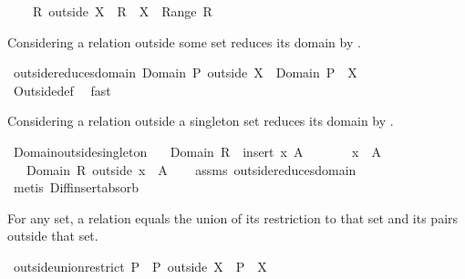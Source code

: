 \begin{isabellebody}
\ \ \ \ {\isachardoublequoteopen}R\ outside\ X\ {\isacharequal}\ R\ {\isacharminus}\ {\isacharparenleft}X\ {\isasymtimes}\ Range\ R{\isacharparenright}{\isachardoublequoteclose}%
\begin{isamarkuptext}%
Considering a relation outside some set  reduces its domain by .%
\end{isamarkuptext}%
\isamarkuptrue%
\isamarkupfalse%
\ outside{\isacharunderscore}reduces{\isacharunderscore}domain{\isacharcolon}\ {\isachardoublequoteopen}Domain\ {\isacharparenleft}P\ outside\ X{\isacharparenright}\ {\isacharequal}\ {\isacharparenleft}Domain\ P{\isacharparenright}\ {\isacharminus}\ X{\isachardoublequoteclose}\isanewline
%
\isadelimproof
\ \ \ \ \ \ %
\endisadelimproof
%
\isatagproof
{}\isamarkupfalse%
\ Outside{\isacharunderscore}def\ \isamarkupfalse%
\ fast%
\endisatagproof
{\isafoldproof}%
%
\isadelimproof
%
\endisadelimproof
%
\begin{isamarkuptext}%
Considering a relation outside a singleton set  reduces its domain by 
  .%
\end{isamarkuptext}%
\isamarkuptrue%
\isamarkupfalse%
\ Domain{\isacharunderscore}outside{\isacharunderscore}singleton{\isacharcolon}\isanewline
\ \ \ {\isachardoublequoteopen}Domain\ R\ {\isacharequal}\ insert\ x\ A{\isachardoublequoteclose}\isanewline
\ \ \ \ \ \ \ {\isachardoublequoteopen}x\ {\isasymnotin}\ A{\isachardoublequoteclose}\isanewline
\ \ \ {\isachardoublequoteopen}Domain\ {\isacharparenleft}R\ outside\ {\isacharbraceleft}x{\isacharbraceright}{\isacharparenright}\ {\isacharequal}\ A{\isachardoublequoteclose}\isanewline
%
\isadelimproof
\ \ %
\endisadelimproof
%
\isatagproof
{}\isamarkupfalse%
\ assms\ outside{\isacharunderscore}reduces{\isacharunderscore}domain\ \isamarkupfalse%
\ {\isacharparenleft}metis\ Diff{\isacharunderscore}insert{\isacharunderscore}absorb{\isacharparenright}%
\endisatagproof
{\isafoldproof}%
%
\isadelimproof
%
\endisadelimproof
%
\begin{isamarkuptext}%
For any set, a relation equals the union of its restriction to that set and its
  pairs outside that set.%
\end{isamarkuptext}%
\isamarkuptrue%
\isamarkupfalse%
\ outside{\isacharunderscore}union{\isacharunderscore}restrict{\isacharcolon}\ {\isachardoublequoteopen}P\ {\isacharequal}\ {\isacharparenleft}P\ outside\ X{\isacharparenright}\ {\isasymunion}\ {\isacharparenleft}P\ {\isacharbar}{\isacharbar}\ X{\isacharparenright}{\isachardoublequoteclose}\isanewline

\end{isabellebody}
